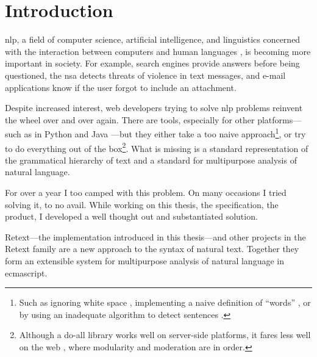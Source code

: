 
\begingroup
\let\clearpage\relax
\let\cleardoublepage\relax
\let\cleardoublepage\relax

\chapter*{Introduction}

\Gls{nlp}, a field of computer science, artificial intelligence, and
linguistics concerned with the interaction between computers and human
languages \autocite[according to WikiPedia, see
][]{wikipedia-natural-language-processing}, is becoming more
important in society. For example, search engines provide answers before
being questioned, the \gls{nsa} detects threats of violence in text
messages, and e-mail applications know if the user forgot to include an
attachment.

Despite increased interest, web developers trying to solve \gls{nlp} problems
reinvent the wheel over and over again. There are tools,
especially for other platforms---such as in Python
\autocite{nltk-source} and Java \autocite{opennlp-source}---but they either
take a too naive approach\footnote{Such as ignoring white space
  \autocite{loadfive/knwl-source-code}, implementing a naive
  definition of ``words'' \autocite{nhunzaker/speakeasy-source-code},
  or by using an inadequate algorithm to detect sentences
  \autocite[][]{nytimes/emphasis-source-code}.}, or try to do everything out
of the box\footnote{Although a do-all library works well on server-side
  platforms, it fares less well on the web \autocite[such
  as][]{NaturalNode/natural-source-code}, where modularity and moderation
  are in order.}. What is missing is a standard representation of the
grammatical hierarchy of text and a standard for multipurpose analysis of
natural language.

For over a year I too camped with this problem. On many occasions I
tried solving it, to no avail. While working on this thesis, the
specification, the product, I developed a well thought out and substantiated
solution.

Retext---the implementation introduced in this thesis---and other projects
in the Retext family are a new approach to the syntax of natural text.
Together they form an extensible system for multipurpose analysis of natural
language in \gls{ecmascript}.

